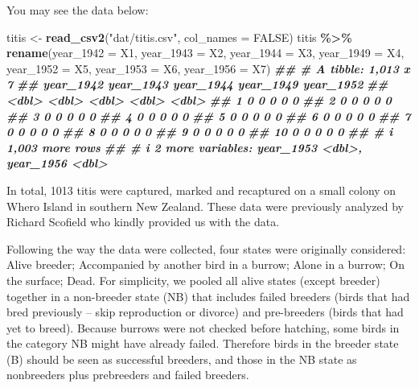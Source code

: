 \documentclass[
  12pt,
]{krantz}
\newenvironment{Shaded}{\begin{snugshade}}{\end{snugshade}}
\newcommand{\AttributeTok}[1]{\textcolor[rgb]{0.13,0.29,0.53}{#1}}
\newcommand{\ConstantTok}[1]{\textcolor[rgb]{0.56,0.35,0.01}{#1}}
\newcommand{\DocumentationTok}[1]{\textcolor[rgb]{0.56,0.35,0.01}{\textbf{\textit{#1}}}}
\newcommand{\FunctionTok}[1]{\textcolor[rgb]{0.13,0.29,0.53}{\textbf{#1}}}
\newcommand{\NormalTok}[1]{#1}
\newcommand{\OtherTok}[1]{\textcolor[rgb]{0.56,0.35,0.01}{#1}}
\newcommand{\SpecialCharTok}[1]{\textcolor[rgb]{0.81,0.36,0.00}{\textbf{#1}}}
\newcommand{\StringTok}[1]{\textcolor[rgb]{0.31,0.60,0.02}{#1}}
\begin{document}
You may see the data below:

\begin{Shaded}
\begin{Highlighting}[]
\NormalTok{titis }\OtherTok{\textless{}{-}} \FunctionTok{read\_csv2}\NormalTok{(}\StringTok{"dat/titis.csv"}\NormalTok{, }
                   \AttributeTok{col\_names =} \ConstantTok{FALSE}\NormalTok{)}
\NormalTok{titis }\SpecialCharTok{\%\textgreater{}\%}
  \FunctionTok{rename}\NormalTok{(}\AttributeTok{year\_1942 =}\NormalTok{ X1,}
         \AttributeTok{year\_1943 =}\NormalTok{ X2,}
         \AttributeTok{year\_1944 =}\NormalTok{ X3,}
         \AttributeTok{year\_1949 =}\NormalTok{ X4,}
         \AttributeTok{year\_1952 =}\NormalTok{ X5,}
         \AttributeTok{year\_1953 =}\NormalTok{ X6,}
         \AttributeTok{year\_1956 =}\NormalTok{ X7)}
\DocumentationTok{\#\# \# A tibble: 1,013 x 7}
\DocumentationTok{\#\#    year\_1942 year\_1943 year\_1944 year\_1949 year\_1952}
\DocumentationTok{\#\#        \textless{}dbl\textgreater{}     \textless{}dbl\textgreater{}     \textless{}dbl\textgreater{}     \textless{}dbl\textgreater{}     \textless{}dbl\textgreater{}}
\DocumentationTok{\#\#  1         0         0         0         0         0}
\DocumentationTok{\#\#  2         0         0         0         0         0}
\DocumentationTok{\#\#  3         0         0         0         0         0}
\DocumentationTok{\#\#  4         0         0         0         0         0}
\DocumentationTok{\#\#  5         0         0         0         0         0}
\DocumentationTok{\#\#  6         0         0         0         0         0}
\DocumentationTok{\#\#  7         0         0         0         0         0}
\DocumentationTok{\#\#  8         0         0         0         0         0}
\DocumentationTok{\#\#  9         0         0         0         0         0}
\DocumentationTok{\#\# 10         0         0         0         0         0}
\DocumentationTok{\#\# \# i 1,003 more rows}
\DocumentationTok{\#\# \# i 2 more variables: year\_1953 \textless{}dbl\textgreater{}, year\_1956 \textless{}dbl\textgreater{}}
\end{Highlighting}
\end{Shaded}

In total, 1013 titis were captured, marked and recaptured on a small colony on Whero Island in southern New Zealand. These data were previously analyzed by Richard Scofield who kindly provided us with the data.

Following the way the data were collected, four states were originally considered: Alive breeder; Accompanied by another bird in a burrow; Alone in a burrow; On the surface; Dead. For simplicity, we pooled all alive states (except breeder) together in a non-breeder state (NB) that includes failed breeders (birds that had bred previously -- skip reproduction or divorce) and pre-breeders (birds that had yet to breed). Because burrows were not checked before hatching, some birds in the category NB might have already failed. Therefore birds in the breeder state (B) should be seen as successful breeders, and those in the NB state as nonbreeders plus prebreeders and failed breeders.
\end{document}
